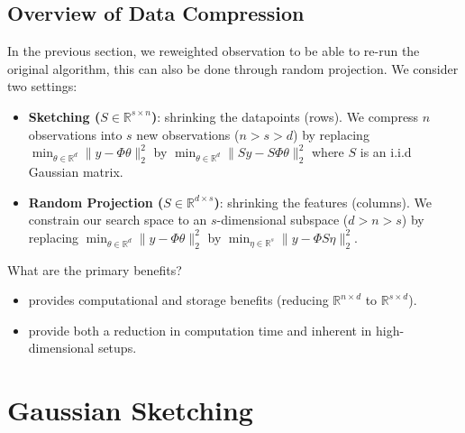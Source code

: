 \documentclass[
11pt,notheorems,hyperref={pdfauthor=whatever}
]{beamer}
\begin{document}
\subsection{Overview of Data Compression}
\begin{frame}
    In the previous section, we reweighted observation to be able to re-run the original algorithm, this can also be done through random projection.
    We consider two settings:
    \begin{itemize}
        \item \alert{\textbf{Sketching (\(S \in \mathbb{R}^{s \times n}\))}}: shrinking the datapoints (rows). We compress \(n\) observations into \(s\) new observations (\(n > s > d\)) by replacing \(\min_{\theta \in \mathbb{R}^d}\|y - \Phi\theta \|^2_2 \) by \(\min_{\theta \in \mathbb{R}^d}\|Sy - S\Phi\theta \|^2_2 \) where \(S\) is an i.i.d Gaussian matrix.
        \item \alert{\textbf{Random Projection (\(S \in \mathbb{R}^{d \times s}\))}}: shrinking the features (columns). We constrain our search space to an \(s\)-dimensional subspace (\(d > n > s\)) by replacing \(\min_{\theta \in \mathbb{R}^d}\|y - \Phi\theta \|^2_2 \) by \(\min_{\eta \in \mathbb{R}^s}\|y - \Phi S \eta \|^2_2 \).
    \end{itemize}
    What are the primary benefits?
    \begin{itemize}
    \item {} provides computational and storage benefits (reducing \(\mathbb{R}^{n \times d}\) to \(\mathbb{R}^{s \times d}\)).
    \item {} provide both a reduction in computation time and inherent  in high-dimensional setups.
\end{itemize}
\end{frame}

\section{Gaussian Sketching}
\end{document}
